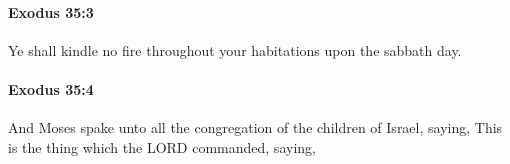 		\paragraph{Exodus 35:3} %
			\label{EXODUS-35-3}

			Ye shall kindle no fire throughout your habitations upon the sabbath day.


		\paragraph{Exodus 35:4} %
			\label{EXODUS-35-4}

			And Moses spake unto all the congregation of the children of Israel, saying, This is the thing which the LORD commanded, saying,


